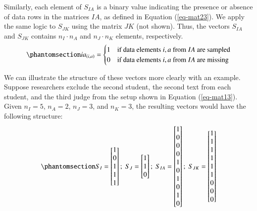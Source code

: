 \documentclass[
  authoryear,
  review,
  1p]{elsarticle}
\begin{document}
Similarly, each element of \(S_{IA}\) is a binary value indicating the
presence or absence of data rows in the matrices \(IA\), as defined in
Equation (\ref{eq-mat23}). We apply the same logic to \(S_{JK}\) using
the matrix \(JK\) (not shown). Thus, the vectors \(S_{IA}\) and
\(S_{JK}\) contains \(n_{I} \cdot n_{A}\) and \(n_{J} \cdot n_{K}\)
elements, respectively. \begin{equation}\phantomsection\label{eq-mat23}{
ia_{(i,a)} = \begin{cases} 
1 & \text{if data elements } i,a \text{ from } IA \text{ are sampled} \\
0 & \text{if data elements } i,a \text{ from } IA \text{ are missing}
\end{cases}
}\end{equation}

We can illustrate the structure of these vectors more clearly with an
example. Suppose researchers exclude the second student, the second text
from each student, and the third judge from the setup shown in Equation
(\ref{eq-mat13}). Given \(n_{I} = 5\), \(n_{A} = 2\), \(n_{J} = 3\), and
\(n_{K} = 3\), the resulting vectors would have the following structure:
\begin{equation}\phantomsection\label{eq-mat24}{
S_{I} = \begin{bmatrix}
1 \\
0 \\
1 \\
1 \\
1
\end{bmatrix} ; \;
S_{J} = \begin{bmatrix}
1 \\
1 \\
0
\end{bmatrix} ; \;
S_{IA} = \begin{bmatrix}
1 \\
0 \\
0 \\
0 \\
1 \\
0 \\
1 \\
0 \\
1 \\
0 
\end{bmatrix} ; \;
S_{JK} = \begin{bmatrix}
1 \\
1 \\
1 \\
1 \\
1 \\
1 \\
0 \\
0 \\
0 
\end{bmatrix}
}\end{equation}
\end{document}
